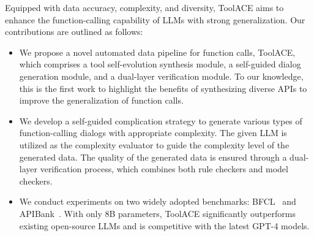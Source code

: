 \documentclass{article}
\begin{document}
Equipped with data accuracy, complexity, and diversity, ToolACE aims to enhance the function-calling capability of LLMs with strong generalization. Our contributions are outlined as follows:
\begin{itemize}[left=0pt]
    \item We propose a novel automated data pipeline for function calls, ToolACE, which comprises a tool self-evolution synthesis module, a self-guided dialog generation module, and a dual-layer verification module. To our knowledge, this is the first work to highlight the benefits of synthesizing diverse APIs to improve the generalization of function calls.
    \item We develop a self-guided complication strategy to generate various types of function-calling dialogs with appropriate complexity. The given LLM is utilized as the complexity evaluator to guide the complexity level of the generated data. The quality of the generated data is ensured through a dual-layer verification process, which combines both rule checkers and model checkers.
    \item We conduct experiments on two widely adopted benchmarks: BFCL~\cite{berkeley-function-calling-leaderboard} and APIBank~\cite{li2023api}. With only 8B parameters, ToolACE significantly outperforms existing open-source LLMs and is competitive with the latest GPT-4 models.
\end{itemize}















\end{document}
